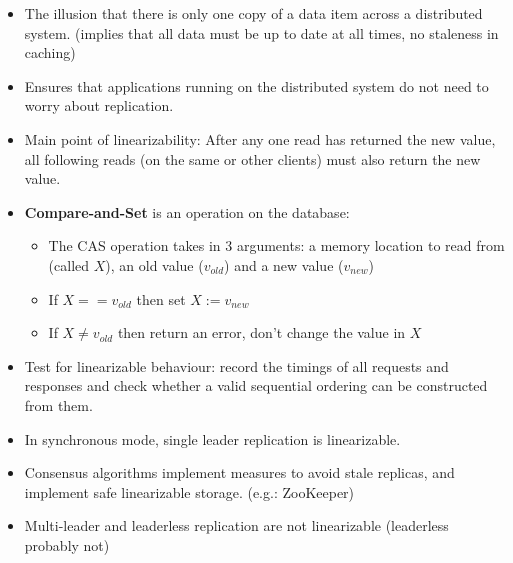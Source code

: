 \documentclass{article}
\begin{document}
\begin{itemize}
    \item The illusion that there is only one copy of a data item across a distributed system. (implies that all data must be up to date at all times, no staleness in caching)
    
    \item Ensures that applications running on the distributed system do not need to worry about replication. 
    
    \item Main point of linearizability: After any one read has returned the new value, all following reads (on the same or other clients) must also return the new value.
    
    \item \textbf{Compare-and-Set} is an operation on the database:
    \begin{itemize}
        \item The CAS operation takes in 3 arguments: a memory location to read from (called $X$), an old value ($v_{old}$) and a new value ($v_{new}$)
        
        \item If $X == v_{old}$ then set $X := v_{new}$
        
        \item If $X \ne v_{old}$ then return an error, don't change the value in $X$
    \end{itemize}
    
    \item Test for linearizable behaviour: record the timings of all requests and responses and check whether a valid sequential ordering can be constructed from them. 
    
    \item In synchronous mode, single leader replication is linearizable. 
    
    \item Consensus algorithms implement measures to avoid stale replicas, and implement safe linearizable storage. (e.g.: ZooKeeper)
    
    \item Multi-leader and leaderless replication are not linearizable (leaderless probably not)
\end{itemize}
\end{document}
